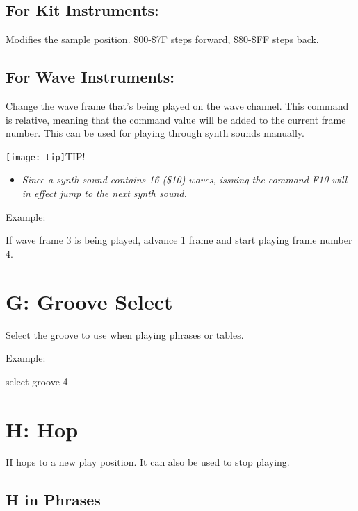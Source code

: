 \subsection{For Kit Instruments:}
Modifies the sample position. \$00-\$7F steps forward, \$80-\$FF steps back.

\subsection{For Wave Instruments:}
Change the wave frame that's being played on the wave channel. This command is relative, meaning that the command value will be added to the current frame number. This can be used for playing through synth sounds manually.

\texttt{[image: tip]}TIP!
\begin{itemize}
        \item \textit{Since a synth sound contains 16 (\$10) waves, issuing the command \textsc{F10} will in effect jump to the next synth sound.}
	\end{itemize}

\begin{description}
\item Example:
\item[F01] If wave frame 3 is being played, advance 1 frame and start playing frame number 4.
\end{description}

\section{G: Groove Select}

Select the groove to use when playing phrases or tables.

\begin{description}
\item Example:
\item[G04] select groove 4
\end{description}

\section{H: Hop}

H hops to a new play position. It can also be used to stop playing.

\subsection{H in Phrases}

